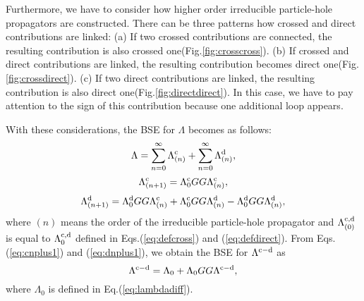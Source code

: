 %
Furthermore, we have to consider how higher order irreducible particle-hole propagators are constructed.
There can be three patterns how crossed and direct contributions are linked:
(a) If two crossed contributions are connected, the resulting contribution is also crossed one(Fig.\ref{fig:crosscross}).
(b) If crossed and direct contributions are linked, the resulting contribution becomes direct one(Fig.\ref{fig:crossdirect}).
(c) If two direct contributions are linked, the resulting contribution is also direct one(Fig.\ref{fig:directdirect}). 
In this case, we have to pay attention to the sign of this contribution because one additional loop appears.

With these considerations, the BSE for $\Lambda$ becomes as follows:
%
\begin{equation}
	\Lambda = \sum_{n=0}^{\infty}\Lambda^{\rm c}_{(n)} + \sum_{n=0}^{\infty}\Lambda^{\rm d}_{(n)},
	\label{eq:BSE}
\end{equation}
%
\begin{equation}
	\Lambda^{\rm c}_{(n+1)} = \Lambda^{\rm c}_0GG\Lambda^{\rm c}_{(n)},
	\label{eq:cnplus1}
\end{equation}
%
\begin{equation}
	\Lambda^{\rm d}_{(n+1)} = \Lambda^{\rm d}_0GG\Lambda^{\rm c}_{(n)}
	+ \Lambda^{\rm c}_0GG\Lambda^{\rm d}_{(n)}
	- \Lambda^{\rm d}_0GG\Lambda^{\rm d}_{(n)},
	\label{eq:dnplus1}
\end{equation}
%
where $(n)$ means the order of the irreducible particle-hole propagator
and $\Lambda^{\rm c, \rm d}_{(0)}$ is equal to $\Lambda^{\rm c, \rm d}_0$ defined in Eqs.(\ref{eq:defcross}) and (\ref{eq:defdirect}).
From Eqs.(\ref{eq:cnplus1}) and (\ref{eq:dnplus1}), we obtain the BSE for $\Lambda^{\rm c - \rm d}$ as
%
\begin{equation}
	\Lambda^{\rm c - \rm d}= \Lambda_0 + 
	\Lambda_0GG\Lambda^{\rm c - \rm d},
	\label{eq:BSELambda}
\end{equation}
%
where $\Lambda_0$ is defined in Eq.(\ref{eq:lambdadiff}).

